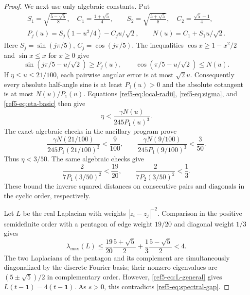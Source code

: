 \documentclass[11pt]{article}
\theoremstyle{remark}
\newcommand{\one}{\mathbf 1}
\numberwithin{equation}{section}
\begin{document}
\begin{proof}
We next use only algebraic constants. Put
\begin{equation}\label{ref5-eq:algebraic-trig}
\begin{gathered}
 S_1=\sqrt{\frac{5-\sqrt5}{8}},\quad C_1=\frac{1+\sqrt5}{4},
 \qquad
 S_2=\sqrt{\frac{5+\sqrt5}{8}},\quad C_2=\frac{\sqrt5-1}{4},\\
 P_j(u)=S_j(1-u^2/4)-C_j u/\sqrt2,\qquad
 N(u)=C_1+S_1u/\sqrt2.
\end{gathered}
\end{equation}
Here $S_j=\sin(j\pi/5)$, $C_j=\cos(j\pi/5)$.
The inequalities $\cos x\ge1-x^2/2$ and $\sin x\le x$ for $x\ge0$
give
\[
 \sin(j\pi/5-u/\sqrt2)\ge P_j(u),\qquad
 \cos(\pi/5-u/\sqrt2)\le N(u).
\]
If $\eta\le u\le21/100$, each pairwise angular error is at most
$\sqrt2u$. Consequently every absolute half-angle sine is at least
$P_1(u)>0$ and the absolute cotangent is at most $N(u)/P_1(u)$.
Equations \eqref{ref5-eq:local-radii}, \eqref{ref5-eq:sigma}, and
\eqref{ref5-eq:eta-basic} then give
\begin{equation}\label{ref5-eq:algebraic-iteration}
 \eta<\frac{\gamma N(u)}{245P_1(u)^3}.
\end{equation}
The exact algebraic checks in the ancillary program prove
\begin{equation}\label{ref5-eq:two-steps}
 \frac{\gamma N(21/100)}{245P_1(21/100)^3}<\frac9{100},
 \qquad
 \frac{\gamma N(9/100)}{245P_1(9/100)^3}<\frac3{50}.
\end{equation}
Thus $\eta<3/50$. The same algebraic checks give
\begin{equation}\label{ref5-eq:weights}
 \frac{2}{7P_1(3/50)^2}<\frac{19}{20},\qquad
 \frac{2}{7P_2(3/50)^2}<\frac13.
\end{equation}
These bound the inverse squared distances on consecutive pairs
and diagonals in the cyclic order, respectively.

Let $L$ be the real Laplacian with weights $|z_i-z_j|^{-2}$.
Comparison in the positive semidefinite order with a pentagon of
edge weight $19/20$ and diagonal weight $1/3$ gives
\begin{equation}\label{ref5-eq:spectral-gap}
 \lambda_{\max}(L)\le
 \frac{19}{20}\frac{5+\sqrt5}{2}
 +\frac13\frac{5-\sqrt5}{2}<4.
\end{equation}
The two Laplacians of the pentagon and its complement are simultaneously
diagonalized by the discrete Fourier basis; their nonzero eigenvalues
are $(5\pm\sqrt5)/2$ in complementary order.
However, \eqref{ref5-eq:L-general} gives $L(t-\one)=4(t-\one)$.
As $s>0$, this contradicts \eqref{ref5-eq:spectral-gap}.
\end{proof}
\end{document}
